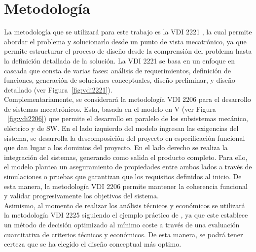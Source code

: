     \section{Metodología}
  

    	La metodología que se utilizará para este trabajo es la VDI 2221 \autocite{jansch2006development}, la cual permite abordar el problema y solucionarlo desde un punto de vista mecatrónico, ya que permite estructurar el proceso de diseño desde la comprensión del problema hasta la definición detallada de la solución. La VDI 2221 se basa en un enfoque en cascada que consta de varias fases: análisis de requerimientos, definición de funciones, generación de soluciones conceptuales, diseño preliminar, y diseño detallado (ver Figura~\ref{fig:vdi2221}).\\
        
        Complementariamente, se considerará la metodología VDI 2206 \autocite{ej-06-cita-norma-vdi2206} para el desarrollo de sistemas mecatrónicos. Esta, basada en el modelo en V (ver Figura ~\ref{fig:vdi2206}) que permite el desarrollo en paralelo de los subsistemas mecánico, eléctrico y de \ac{SW}. En el lado izquierdo del modelo ingresan las exigencias del sistema, se desarrolla la descomposición del proyecto en especificación funcional  que dan lugar a los dominios del proyecto. En el lado derecho se realiza la integración del sistemas, generando como salida el producto completo. Para ello, el modelo plantea un aseguramiento de propiedades entre ambos lados a través de simulaciones o pruebas que garantizan que los requisitos definidos al inicio. De esta manera, la metodología VDI 2206 permite mantener la coherencia funcional y validar progresivamente los objetivos del sistema.\\
        
        Asimismo, al momento de realizar los análisis técnicos y económicos se utilizará la metodología VDI 2225 siguiendo el ejemplo práctico de  \textcite{sandoval2025conceptual}, ya que este establece un método de decisión optimizado al mínimo coste a través de una evaluación cuantitativa de criterios técnicos y económicos. De esta manera, se podrá tener certeza que se ha elegido el diseño conceptual más optimo. \\

